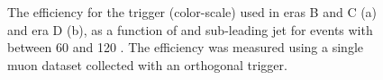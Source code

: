 \begin{figure} 
 \caption{The efficiency for the trigger (color-scale) used in eras B and C (a) and era D (b), as a function of \Mjj and sub-leading jet \pt for events with \METnoMU between 60 and 120 \GeV. The efficiency was measured using a single muon dataset collected with an orthogonal trigger.}
  \label{fig:parked3dtrigeff}
\end{figure}

